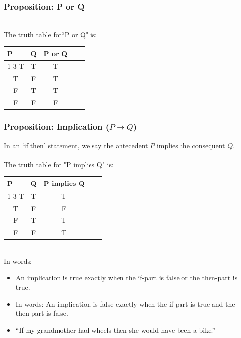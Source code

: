 \documentclass[aspectratio=169]{beamer}
\numberwithin{equation}{section}
\begin{document}
\begin{frame}
\frametitle{Proposition: P or Q}

\ \\The truth table for``P or Q" is:

\begin{table}[]
\begin{tabular}{cccll}
\multicolumn{1}{l}{P} & \multicolumn{1}{l}{Q} & \multicolumn{1}{l}{P or Q} &  &  \\ \cline{1-3}
T                     & T                     & T                          &  &  \\
T                     & F                     & T                          &  &  \\
F                     & T                     & T                          &  &  \\
F                     & F                     & F                          &  & 
\end{tabular}
\end{table}

\end{frame}



\begin{frame}
\frametitle{Proposition: Implication ($P\rightarrow Q$)}

In an `if then' statement, we say the antecedent $P$ implies the consequent $Q$.\\

\ \\The truth table for "P implies Q" is:

\begin{table}[]
\begin{tabular}{cccll}
\multicolumn{1}{l}{P} & \multicolumn{1}{l}{Q} & \multicolumn{1}{l}{P implies Q} &  &  \\ \cline{1-3}
T                     & T                     & T                               &  &  \\
T                     & F                     & F                               &  &  \\
F                     & T                     & T                               &  &  \\
F                     & F                     & T                               &  & 
\end{tabular}
\end{table} \pause

\ \\In words: 
\begin{itemize}
\item An implication is true exactly when the if-part is false or the then-part is true. 
\item In words: An implication is false exactly when the if-part is true and the then-part is false. 
\pause
\item ``If my grandmother had wheels then she would have been a bike.''
\end{itemize}
\end{frame}
\end{document}
